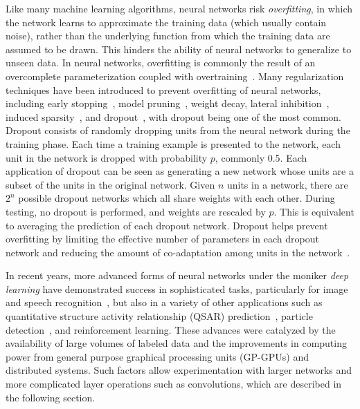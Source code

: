 Like many machine learning algorithms, neural networks risk \textit{overfitting}, in which the network learns to approximate the training data (which usually contain noise), rather than the underlying function from which the training data are assumed to be drawn.
This hinders the ability of neural networks to generalize to unseen data.
In neural networks, overfitting is commonly the result of an overcomplete parameterization coupled with overtraining~\cite{reed1993, dalianis1993}.
Many regularization techniques have been introduced to prevent overfitting of neural networks, including early stopping~\cite{morgan1990}, model pruning~\cite{reed1993}, weight decay\cite{krogh1992}, lateral inhibition~\cite{krizhevsky2012}, induced sparsity~\cite{ng2011, makhzani2015}, and dropout~\cite{srivastava2014}, with dropout being one of the most common. 
Dropout consists of randomly dropping units from the neural network during the training phase.
Each time a training example is presented to the network, each unit in the network is dropped with probability $p$, commonly 0.5.
Each application of dropout can be seen as generating a new network whose units are a subset of the units in the original network.
Given $n$ units in a network, there are $2^n$ possible dropout networks which all share weights with each other.
During testing, no dropout is performed, and weights are rescaled by $p$.
This is equivalent to averaging the prediction of each dropout network.
Dropout helps prevent overfitting by limiting the effective number of parameters in each dropout network and reducing the amount of co-adaptation among units in the network~\cite{srivastava2014}.


In recent years, more advanced forms of neural networks under the moniker \textit{deep learning} have demonstrated success in sophisticated tasks, particularly for image and speech recognition~\cite{krizhevsky2012, lecun2015, masci2011, hinton2012, he2016}, but also in a variety of other applications such as quantitative structure activity relationship (QSAR) prediction~\cite{ma2015}, particle detection~\cite{ciodaro2012}, and reinforcement learning\cite{mnih2015}.
These advances were catalyzed by the availability of large volumes of labeled data\cite{deng2009, krizhevsky2009} and the improvements in computing power from general purpose graphical processing units (GP-GPUs) and distributed systems\cite{chetlur2014, chu2007}.
Such factors allow experimentation with larger networks and more complicated layer operations such as convolutions, which are described in the following section.

